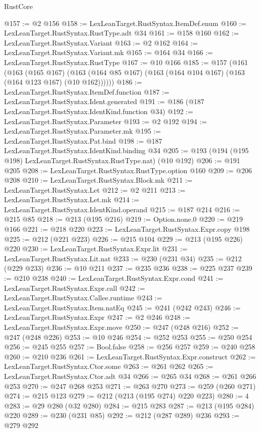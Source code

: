 \begin{lexlean}{RustCore}
\begin{coremodule}
@157 := @2 @156
@158 := LexLeanTarget.RustSyntax.ItemDef.enum
@160 := LexLeanTarget.RustSyntax.RustType.adt @34
@161 := @158 @160
@162 := LexLeanTarget.RustSyntax.Variant
@163 := @2 @162
@164 := LexLeanTarget.RustSyntax.Variant.mk
@165 := @164 @34
@166 := LexLeanTarget.RustSyntax.RustType
@167 := @10 @166
@185 := @157
    (@161
      (@163
        (@165 @167)
        (@163 (@164 @85 @167) (@163 (@164 @104 @167) (@163 (@164 @123 @167) (@10 @162))))))
@186 := LexLeanTarget.RustSyntax.ItemDef.function
@187 := LexLeanTarget.RustSyntax.Ident.generated
@191 := @186 (@187 LexLeanTarget.RustSyntax.IdentKind.function @34)
@192 := LexLeanTarget.RustSyntax.Parameter
@193 := @2 @192
@194 := LexLeanTarget.RustSyntax.Parameter.mk
@195 := LexLeanTarget.RustSyntax.Pat.bind
@198 := @187 LexLeanTarget.RustSyntax.IdentKind.binding @34
@205 := @193 (@194 (@195 @198) LexLeanTarget.RustSyntax.RustType.nat) (@10 @192)
@206 := @191 @205
@208 := LexLeanTarget.RustSyntax.RustType.option @160
@209 := @206 @208
@210 := LexLeanTarget.RustSyntax.Block.mk
@211 := LexLeanTarget.RustSyntax.Let
@212 := @2 @211
@213 := LexLeanTarget.RustSyntax.Let.mk
@214 := LexLeanTarget.RustSyntax.IdentKind.operand
@215 := @187 @214
@216 := @215 @85
@218 := @213 (@195 @216)
@219 := Option.none.{0}
@220 := @219 @166
@221 := @218 @220
@223 := LexLeanTarget.RustSyntax.Expr.copy @198
@225 := @212 (@221 @223)
@226 := @215 @104
@229 := @213 (@195 @226) @220
@230 := LexLeanTarget.RustSyntax.Expr.lit
@231 := LexLeanTarget.RustSyntax.Lit.nat
@233 := @230 (@231 @34)
@235 := @212 (@229 @233)
@236 := @10 @211
@237 := @235 @236
@238 := @225 @237
@239 := @210 @238
@240 := LexLeanTarget.RustSyntax.Expr.cond
@241 := LexLeanTarget.RustSyntax.Expr.call
@242 := LexLeanTarget.RustSyntax.Callee.runtime
@243 := LexLeanTarget.RustSyntax.Item.natEq
@245 := @241 (@242 @243)
@246 := LexLeanTarget.RustSyntax.Expr
@247 := @2 @246
@248 := LexLeanTarget.RustSyntax.Expr.move
@250 := @247 (@248 @216)
@252 := @247 (@248 @226)
@253 := @10 @246
@254 := @252 @253
@255 := @250 @254
@256 := @245 @255
@257 := Bool.false
@258 := @256 @257
@259 := @240 @258
@260 := @210 @236
@261 := LexLeanTarget.RustSyntax.Expr.construct
@262 := LexLeanTarget.RustSyntax.Ctor.some
@263 := @261 @262
@265 := LexLeanTarget.RustSyntax.Ctor.adt @34
@266 := @265 @34
@268 := @261 @266 @253
@270 := @247 @268 @253
@271 := @263 @270
@273 := @259 (@260 @271)
@274 := @215 @123
@279 := @212 (@213 (@195 @274) @220 @223)
@280 := 4
@283 := @29 @280 (@32 @280)
@284 := @215 @283
@287 := @213 (@195 @284) @220
@289 := @230 (@231 @85)
@292 := @212 (@287 @289) @236
@293 := @279 @292

\end{coremodule}
\end{lexlean}
